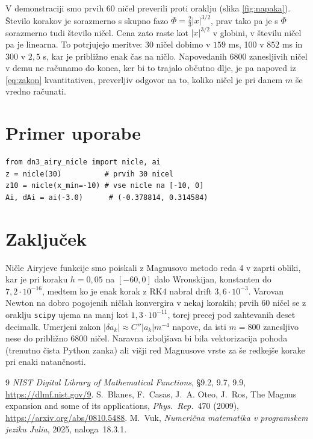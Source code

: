 \documentclass[11pt,a4paper]{article}
\begin{document}
V demonstraciji smo prvih 60 ničel preverili proti oraklju (slika \ref{fig:napaka}). 
Število korakov je sorazmerno s skupno fazo
$\Phi = \tfrac23 |x|^{3/2}$, prav tako pa je s $\Phi$ sorazmerno tudi število
ničel. Cena zato raste kot $|x|^{3/2}$ v globini, v številu ničel pa je
linearna. To potrjujejo meritve: 30 ničel dobimo v $159$ ms, 100 v $852$ ms in
300 v $2{,}5$ s, kar je približno enak čas na ničlo. 
Napovedanih $6800$ zanesljivih ničel v demu ne računamo do konca, ker bi to trajalo občutno dlje,
je pa napoved iz \eqref{eq:zakon} kvantitativen, preverljiv odgovor na to,
koliko ničel je pri danem $m$ še vredno računati.

\section{Primer uporabe}

\begin{minipage}{\linewidth}
\begin{lstlisting}
from dn3_airy_nicle import nicle, ai
z = nicle(30)          # prvih 30 nicel
z10 = nicle(x_min=-10) # vse nicle na [-10, 0]
Ai, dAi = ai(-3.0)      # (-0.378814, 0.314584)
\end{lstlisting}
\end{minipage}

\section{Zaključek}

Ničle Airyjeve funkcije smo poiskali z Magnusovo metodo reda 4 v zaprti
obliki, kar je pri koraku $h=0{,}05$ na $[-60,0]$ dalo Wronskijan, konstanten
do $7{,}2\cdot10^{-16}$, medtem ko je enak korak z RK4 nabral drift
$3{,}6\cdot10^{-3}$. Varovan Newton na dobro pogojenih ničlah konvergira v
nekaj korakih; prvih 60 ničel se z oraklju \texttt{scipy} ujema na manj kot
$1{,}3\cdot10^{-11}$, torej precej pod zahtevanih deset decimalk. Umerjeni
zakon $|\delta a_k| \approx C''|a_k|m^{-4}$ napove, da isti $m=800$ zanesljivo
nese do približno $6800$ ničel. Naravna izboljšava bi bila vektorizacija
pohoda (trenutno čista Python zanka) ali višji red Magnusove vrste za še
redkejše korake pri enaki natančnosti.

\begin{thebibliography}{9}
 \emph{NIST Digital Library of Mathematical Functions},
  \S 9.2, 9.7, 9.9, \url{https://dlmf.nist.gov/9}.
 S.~Blanes, F.~Casas, J.~A. Oteo, J.~Ros, The Magnus
  expansion and some of its applications, \emph{Phys.\ Rep.}\ 470 (2009),
  \url{https://arxiv.org/abs/0810.5488}.
 M.~Vuk, \emph{Numerična matematika v programskem jeziku
  Julia}, 2025, naloga~18.3.1.
\end{thebibliography}
\end{document}
